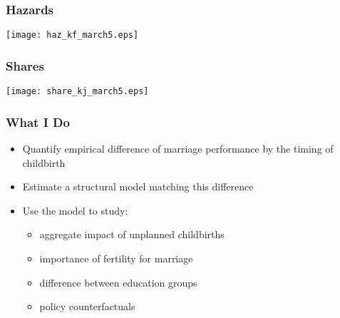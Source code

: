 \documentclass{beamer}
\begin{document}
\begin{frame}[label=pic0]
\frametitle{Hazards}
\begin{center}
\texttt{[image: haz\_kf\_march5.eps]}
\end{center}
\end{frame}

\begin{frame}[label=pic0]
\frametitle{Shares}
\begin{center}
\texttt{[image: share\_kj\_march5.eps]}
\end{center}
\end{frame}


\begin{frame}[plain]
\frametitle{What I Do}
\begin{itemize}
\item Quantify empirical difference of marriage performance by the timing of childbirth
\item Estimate a structural model matching this difference
\item Use the model to study:
\begin{itemize}
\item aggregate impact of unplanned childbirths 
\item importance of fertility for marriage
\item difference between education groups
\item policy counterfactuals
\end{itemize}
\end{itemize}
\end{frame}
\end{document}
